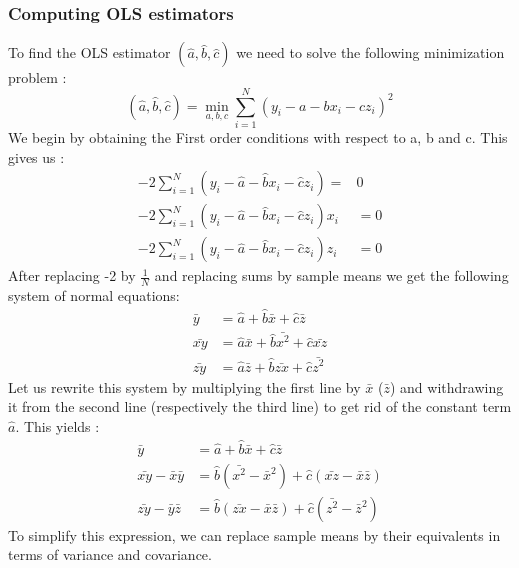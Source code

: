 \documentclass{article}
\begin{document}
\subsubsection{Computing OLS estimators}
To find the OLS estimator $(\hat{a},\hat{b}, \hat{c})$ we need to solve the following minimization problem  : 
\begin{equation}
(\hat{a},\hat{b}, \hat{c}) =  \min_{a,b,c}  \sum_{i=1}^N (y_i - a - bx_i - cz_i )^2 
\end{equation}
We begin by obtaining the First order conditions with respect to a, b and c. This gives us : 
\begin{equation}
\begin{aligned}
-2 \sum_{i=1}^N (y_i-\hat{a}-\hat{b}x_i-\hat{c}z_i)  =& 0 \\
-2 \sum_{i=1}^N (y_i-\hat{a}-\hat{b}x_i-\hat{c}z_i)x_i & = 0\\
-2 \sum_{i=1}^N (y_i-\hat{a}-\hat{b}x_i-\hat{c}z_i)z_i & = 0
\end{aligned}
\end{equation}
After replacing -2 by $\frac{1}{N}$ and replacing sums by sample means we get the following system of normal equations:  
\begin{equation}
\begin{aligned}
\bar{y} &= \hat{a} + \hat{b}\bar{x} + \hat{c}\bar{z}\\
\bar{xy} &= \hat{a}\bar{x} + \hat{b}\bar{x^2} + \hat{c}\bar{xz}\\
\bar{zy} &= \hat{a}\bar{z} + \hat{b}\bar{zx} + \hat{c}\bar{z^2}
\end{aligned}
\end{equation}
Let us rewrite this system by multiplying the first line by $\bar{x}$ ($\bar{z}$) and withdrawing it from the second line (respectively the third line) to get rid of the constant term $\hat{a}$. This yields : 
\begin{equation}
\begin{aligned}
\bar{y} &= \hat{a} + \hat{b}\bar{x} + \hat{c}\bar{z}\\
\bar{xy} - \bar{x}\bar{y} &= \hat{b}(\bar{x^2} - \bar{x}^2)+ \hat{c}(\bar{xz}-\bar{x}\bar{z})\\
\bar{zy} - \bar{y}\bar{z} & = \hat{b}(\bar{zx}-\bar{x}\bar{z}) + \hat{c}(\bar{z^2}-\bar{z}^2)
\end{aligned}
\end{equation}
To simplify this expression, we can replace sample means by their equivalents in terms of variance and covariance.\\
\end{document}
